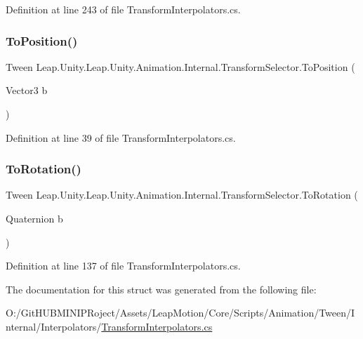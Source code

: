 Definition at line 243 of file Transform\+Interpolators.\+cs.

\mbox{\label{struct_leap_1_1_unity_1_1_leap_1_1_unity_1_1_animation_1_1_internal_1_1_transform_selector_ae25c532c31f47365c2e11845cb3949be}} 
\subsubsection{\texorpdfstring{ToPosition()}{ToPosition()}}
{\footnotesize\ttfamily Tween Leap.\+Unity.\+Leap.\+Unity.\+Animation.\+Internal.\+Transform\+Selector.\+To\+Position (\begin{DoxyParamCaption}\item[{Vector3}]{b }\end{DoxyParamCaption})}



Definition at line 39 of file Transform\+Interpolators.\+cs.

\mbox{\label{struct_leap_1_1_unity_1_1_leap_1_1_unity_1_1_animation_1_1_internal_1_1_transform_selector_a080ea31385ee3af81c273b2263fb3e84}} 
\subsubsection{\texorpdfstring{ToRotation()}{ToRotation()}}
{\footnotesize\ttfamily Tween Leap.\+Unity.\+Leap.\+Unity.\+Animation.\+Internal.\+Transform\+Selector.\+To\+Rotation (\begin{DoxyParamCaption}\item[{Quaternion}]{b }\end{DoxyParamCaption})}



Definition at line 137 of file Transform\+Interpolators.\+cs.



The documentation for this struct was generated from the following file\+:\begin{DoxyCompactItemize}
\item 
O\+:/\+Git\+H\+U\+B\+M\+I\+N\+I\+P\+Roject/\+Assets/\+Leap\+Motion/\+Core/\+Scripts/\+Animation/\+Tween/\+Internal/\+Interpolators/\mbox{\hyperlink{_transform_interpolators_8cs}{Transform\+Interpolators.\+cs}}\end{DoxyCompactItemize}
